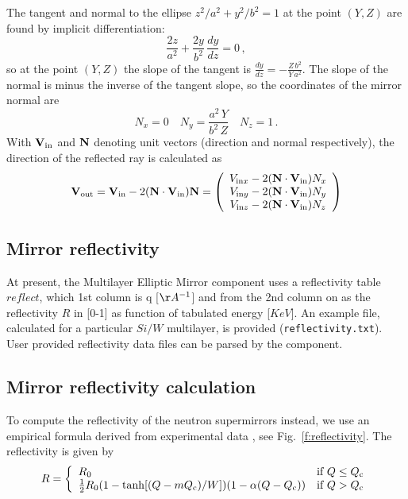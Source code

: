 The tangent and normal to the ellipse $z^2/a^2 + y^2/b^2=1$ at the
point $(Y,Z)$ are found by implicit differentiation: \begin{equation} 
\frac{2z}{a^2} + \frac{2y}{b^2} \,\frac{dy}{dz} = 0\,, \end{equation} so at the
point $(Y,Z)$ the slope of the tangent is $\frac{dy}{dz} =
-\frac{Z\,b^2}{Y\,a^2}$. The slope of the normal is minus the
inverse of the tangent slope, so the coordinates of the mirror
normal are \begin{equation} N_x = 0 \quad N_y = \frac{a^2\,Y}{b^2\,Z} \quad N_z =
1\,. \end{equation} With $\bf{V}_\textrm{in}$ and $\bf{N}$ denoting unit
vectors (direction and normal respectively), the direction of the
reflected ray is calculated as \begin{equation} {\bf{V}}_\textrm{out} =
{\bf{V}}_\textrm{in} -2({\bf{N}}\cdot{\bf{V}}_\textrm{in}){\bf{N}} =
        \left(
      \begin{array}{c}
        V_{\textrm{in}x} - 2({\bf{N}}\cdot{\bf{V}}_\textrm{in})N_x \\
               V_{\textrm{in}y} - 2({\bf{N}}\cdot{\bf{V}}_\textrm{in})N_y \\
                V_{\textrm{in}z} - 2({\bf{N}}\cdot{\bf{V}}_\textrm{in})N_z \\
      \end{array}
    \right)
\end{equation}


\subsection{Mirror reflectivity}
\label{ss:mirrorreflecttable}


At present, the Multilayer Elliptic Mirror component uses a reflectivity table $reflect$, 
which 1st column is q [$\AA^{-1}$] and from the 2nd column on as the reflectivity $R$ in [0-1]
as function of tabulated energy [$KeV$]. 
An example file, calculated for a particular $Si/W$ multilayer, is provided (\verb+reflectivity.txt+).
User provided reflectivity data files can be parsed by the component.

\subsection{Mirror reflectivity calculation}
\label{ss:mirrorreflect}


To compute the reflectivity of the neutron supermirrors instead, we use an empirical
formula derived from experimental data \cite{pb_241_50},
see Fig.~\ref{f:reflectivity}. The reflectivity is given by
\begin{equation} \label{e:Rmirror}
  R = \left\{
    \begin{array}{ll}
      R_0 & \textrm{if $Q \leq Q_{\rm c}$} \\
      \frac{1}{2}R_0(1 - \tanh[(Q - m Q_{\rm c})/W])(1-\alpha(Q-Q_{\rm c}))
         & \textrm{if $Q > Q_{\rm c}$}
    \end{array}
  \right.
\end{equation}


